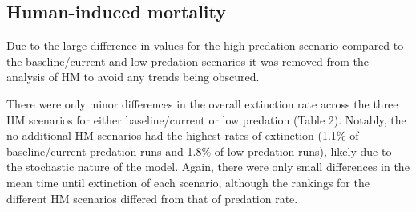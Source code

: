 \documentclass[11pt,]{article}
\begin{document}
\hypertarget{human-induced-mortality}{%
\subsection{Human-induced mortality}\label{human-induced-mortality}}

Due to the large difference in values for the high predation scenario
compared to the baseline/current and low predation scenarios it was
removed from the analysis of HM to avoid any trends being obscured.

There were only minor differences in the overall extinction rate across
the three HM scenarios for either baseline/current or low predation
(Table 2). Notably, the no additional HM scenarios had the highest rates
of extinction (1.1\% of baseline/current predation runs and 1.8\% of low
predation runs), likely due to the stochastic nature of the model.
Again, there were only small differences in the mean time until
extinction of each scenario, although the rankings for the different HM
scenarios differed from that of predation rate.
\end{document}

